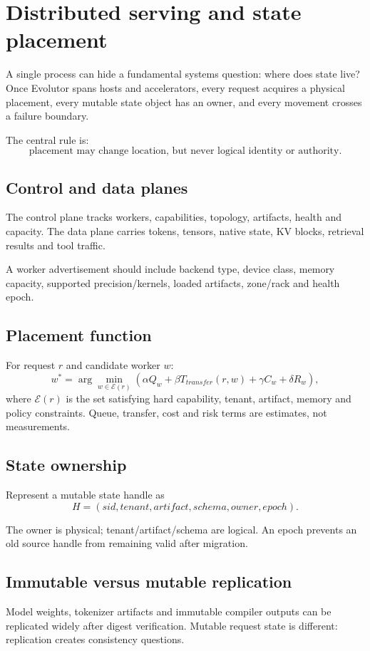 \chapter{Distributed serving and state placement}

A single process can hide a fundamental systems question: where does state live? Once Evolutor spans hosts and accelerators, every request acquires a physical placement, every mutable state object has an owner, and every movement crosses a failure boundary.

The central rule is:
\[
\boxed{\text{placement may change location, but never logical identity or authority}.}
\]

\section{Control and data planes}
The control plane tracks workers, capabilities, topology, artifacts, health and capacity. The data plane carries tokens, tensors, native state, KV blocks, retrieval results and tool traffic.

A worker advertisement should include backend type, device class, memory capacity, supported precision/kernels, loaded artifacts, zone/rack and health epoch.

\section{Placement function}
For request $r$ and candidate worker $w$:
\[
w^*=\arg\min_{w\in \mathcal E(r)}
\left(
\alpha Q_w+\beta T_{transfer}(r,w)+\gamma C_w+\delta R_w
\right),
\]
where $\mathcal E(r)$ is the set satisfying hard capability, tenant, artifact, memory and policy constraints. Queue, transfer, cost and risk terms are estimates, not measurements.

\section{State ownership}
Represent a mutable state handle as
\[
H=(sid,tenant,artifact,schema,owner,epoch).
\]

The owner is physical; tenant/artifact/schema are logical. An epoch prevents an old source handle from remaining valid after migration.

\section{Immutable versus mutable replication}
Model weights, tokenizer artifacts and immutable compiler outputs can be replicated widely after digest verification. Mutable request state is different: replication creates consistency questions.

